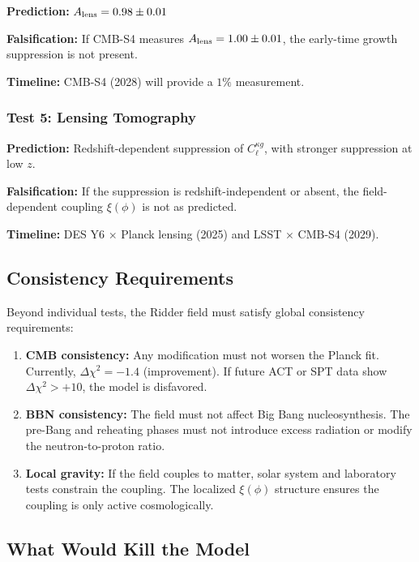 \documentclass[twocolumn,showpacs,preprintnumbers,amsmath,amssymb,prd]{revtex4-2}
\begin{document}
\textbf{Prediction:} $A_{\rm lens} = 0.98 \pm 0.01$

\textbf{Falsification:} If CMB-S4 measures $A_{\rm lens} = 1.00 \pm 0.01$, the early-time growth suppression is not present.

\textbf{Timeline:} CMB-S4 (2028) will provide a $1\%$ measurement.

\subsubsection{Test 5: Lensing Tomography}

\textbf{Prediction:} Redshift-dependent suppression of $C_\ell^{\kappa g}$, with stronger suppression at low $z$.

\textbf{Falsification:} If the suppression is redshift-independent or absent, the field-dependent coupling $\xi(\phi)$ is not as predicted.

\textbf{Timeline:} DES Y6 $\times$ Planck lensing (2025) and LSST $\times$ CMB-S4 (2029).

\subsection{Consistency Requirements}

Beyond individual tests, the Ridder field must satisfy global consistency requirements:

\begin{enumerate}
    \item \textbf{CMB consistency:} Any modification must not worsen the Planck fit. Currently, $\Delta\chi^2 = -1.4$ (improvement). If future ACT or SPT data show $\Delta\chi^2 > +10$, the model is disfavored.
    
    \item \textbf{BBN consistency:} The field must not affect Big Bang nucleosynthesis. The pre-Bang and reheating phases must not introduce excess radiation or modify the neutron-to-proton ratio.
    
    \item \textbf{Local gravity:} If the field couples to matter, solar system and laboratory tests constrain the coupling. The localized $\xi(\phi)$ structure ensures the coupling is only active cosmologically.
\end{enumerate}

\subsection{What Would Kill the Model}
\end{document}
